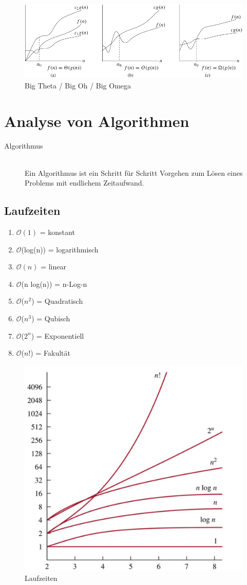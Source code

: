 \begin{figure}[h!]
\centering
\includegraphics[width=0.9\linewidth]{images/big_oh_omega_theta}
\caption{Big Theta / Big Oh / Big Omega}
\end{figure}


\section{Analyse von Algorithmen}
\begin{description}
	\item[Algorithmus] \hfill \\
	Ein Algorithmus ist ein Schritt für Schritt Vorgehen zum Lösen eines Problems mit endlichem Zeitaufwand.
\end{description}

\subsection{Laufzeiten}
\begin{enumerate}
	\item $\mathcal{O}(1)$ = konstant 
	\item $\mathcal{O}$(log(n)) = logarithmisch
	\item $\mathcal{O}(n)$ = linear
	\item $\mathcal{O}$(n log(n)) = n-Log-n
	\item $\mathcal{O}$($n^2$) = Quadratisch
	\item $\mathcal{O}$($n^3$) = Qubisch
	\item $\mathcal{O}$($2^n$) = Exponentiell
	\item $\mathcal{O}$($n!$) = Fakultät
\end{enumerate}

\begin{figure}[h]
	\centering
	\includegraphics[width=0.4\linewidth]{images/laufzeiten}
	\caption{Laufzeiten}
\end{figure}

